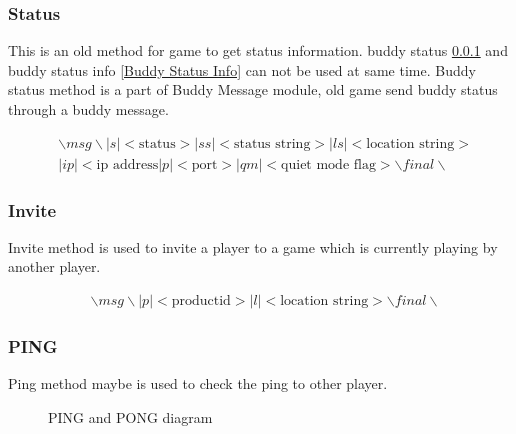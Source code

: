 \documentclass[oneside,titlepage,a4paper]{Definition/retrospy} %
\begin{document}
\subsubsection{Status}\label{Buddy Status}
This is an old method for game to get status information. buddy status \ref{Buddy Status} and buddy status info \ref{Buddy Status Info} can not be used at same time. Buddy status method is a part of Buddy Message module, old game send buddy status through a buddy message.
\begin{tcolorbox}
	\begin{equation}
	\begin{split}
	& \backslash msg \backslash |s|<\text{status}>|ss|<\text{status string}>|ls|<\text{location string}>\\
	&|ip|<\text{ip address}|p|<\text{port}>|qm|<\text{quiet mode flag}> \backslash final \backslash
	\end{split}
	\end{equation}
\end{tcolorbox}
\subsubsection{Invite}
Invite method is used to invite a player to a game which is currently playing by another player.

\begin{tcolorbox}
	\begin{equation}
	\begin{split}
	& \backslash msg \backslash |p|<\text{productid}>|l|<\text{location string}> \backslash final \backslash
	\end{split}
	\end{equation}
\end{tcolorbox}
\subsubsection{PING}
Ping method maybe is used to check the ping to other player. 
\begin{figure}[H]
	\centering
	\caption{PING and PONG diagram}
	\label{PING and PONG diagram}
\end{figure}
\end{document}
